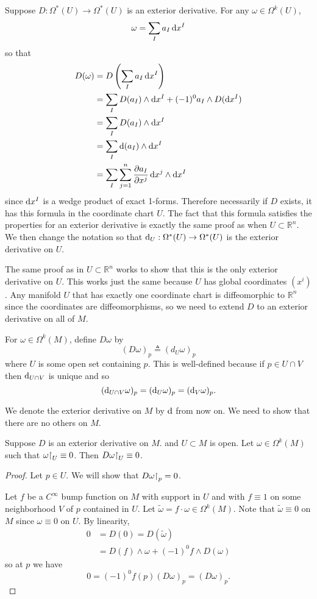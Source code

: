 Suppose $D : \Omega^\ast(U) \to \Omega^\ast(U)$ is an exterior
derivative. For any $\omega \in \Omega^k(U)$,
$$
  \omega
= \sum_I a_I \mathop{}\!\mathrm{d} x^I
$$
so that
\begin{align*}
   D(\omega)
&= D
   \left(
     \sum_I a_I \dif x^I
   \right) \\
&= \sum_I
     D(a_I) \wedge \dif x^I
 + (-1)^0 a_I \wedge D(\dif x^I) \\
&= \sum_I
     D(a_I) \wedge \dif x^I \\
&= \sum_I
     \dif(a_I) \wedge \dif x^I \\
&= \sum_I
     \sum_{j=1}^n
       \frac{\partial a_I}{\partial x^j}
       \dif x^j \wedge \dif x^I
\end{align*}
since $\mathop{}\!\mathrm{d} x^I$ is a wedge product of exact 1-forms.
Therefore necessarily if $D$ exists, it has this formula in the
coordinate chart $U$. The fact that this formula satisfies the
properties for an exterior derivative is exactly the same proof as
when $U \subset \mathbb{R}^n$. We then change the notation so that
$\mathop{}\!\mathrm{d}_U : \Omega^\ast(U) \to \Omega^\ast(U)$ is the exterior
derivative on $U$.

The same proof as in $U \subset \mathbb{R}^n$ works
to show that this is the only exterior derivative on $U$. This works
just the same because $U$ has global coordinates $(x^i)$. Any manifold
$U$ that has exactly one coordinate chart is diffeomorphic to
$\mathbb{R}^n$ since the coordinates are diffeomorphisms, so we need
to extend $D$ to an exterior derivative on all of $M$.

For $\omega \in \Omega^k(M)$, define $D \omega$ by
$$
(D\omega)_p \triangleq (d_U \omega)_p
$$
where $U$ is some open set containing $p$. This is well-defined
because if $p \in U \cap V$ then $\mathop{}\!\mathrm{d}_{U \cap V}$ is unique and so
$$
  (\mathop{}\!\mathrm{d}_{U \cap V} \omega)_p
= (\mathop{}\!\mathrm{d}_U \omega)_p
= (\mathop{}\!\mathrm{d}_V \omega)_p.
$$

We denote the exterior derivative on $M$ by $\mathop{}\!\mathrm{d}$ from now on. We
need to show that there are no others on $M$.

\begin{lemma}
Suppose $D$ is an exterior derivative on $M$. and $U \subset M$ is
open. Let $\omega \in \Omega^k(M)$ such that
$\omega\mathord{\upharpoonright}_U \equiv 0$. Then $D \omega\mathord{\upharpoonright}_U \equiv 0$.
\end{lemma}
\begin{proof}
Let $p \in U$. We will show that $D\omega\mathord{\upharpoonright}_p = 0$.

Let $f$ be a $C^\infty$ bump function on $M$ with support in $U$ and
with $f \equiv 1$ on some neighborhood $V$ of $p$ contained in $U$.
Let $\tilde{\omega} = f \cdot \omega \in \Omega^k(M)$. Note that
$\tilde{\omega} \equiv 0$ on $M$ since $\omega \equiv 0$ on $U$.
By linearity,
\begin{align*}
   0
&= D(0)
 = D(\tilde{\omega}) \\
&= D(f) \wedge \omega + (-1)^0 f \wedge D(\omega)
\end{align*}
so at $p$ we have
$$
0 = (-1)^0 f(p) (D\omega)_p = (D \omega)_p.
$$
\end{proof}

